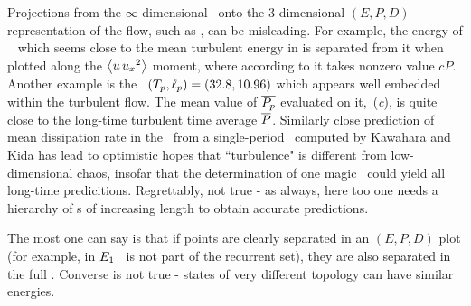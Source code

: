 Projections
from the $\infty$-dimensional \statesp\ onto
the 3-dimensional
$(E,P,D)$ representation of the flow, such as
,
can be misleading.
For example, the energy of \reqva\  which
seems close to the
mean turbulent energy in  is separated
from it when plotted along the
$\left\langle {u \, u_{x}{}^2} \right\rangle$ moment, where according to
 it takes nonzero value $c P$.
Another example is the \rpo\ $({T_{p}},\ell_p) =(32.8,10.96)$
which appears well embedded within the turbulent flow.
The mean value of $\overline{P_p}$
evaluated on it,
\,(\textit{c}),
is quite close to the long-time turbulent
time average $\overline{P}$.
Similarly close prediction of mean dissipation rate in the
\pCf\ from a single-period \po\ computed by
Kawahara and Kida has lead to
optimistic hopes that ``turbulence" is different from
low-dimensional chaos, insofar that the determination of one
magic \po\ could yield all long-time predicitions.
Regrettably, not true - as always, here too one needs a hierarchy
of \po s of increasing length to obtain accurate
predictions.

The most one can say is that if points are clearly separated in an
$(E,P,D)$ plot (for example, in 
$E_{1}$ \eqv\ is not part of the recurrent set), they are also separated
in the full \statesp. Converse is not true - states of
very different topology can have similar energies.
